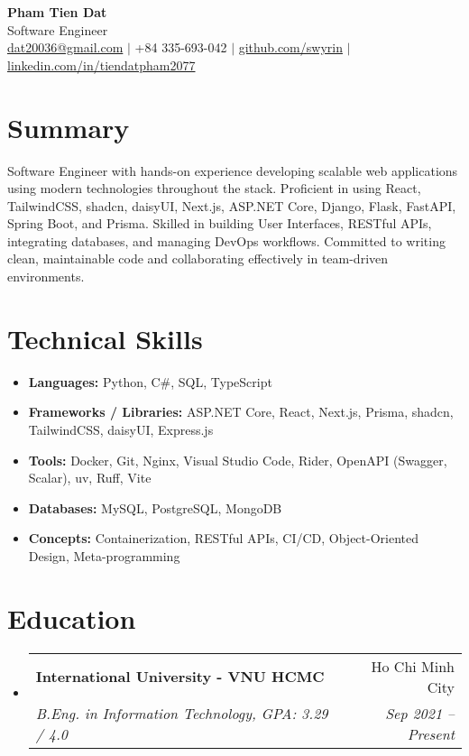 \documentclass[letterpaper,11pt]{article}
\makeatletter
\newcommand{\resumeSubheading}[4]{
  \item
    \begin{tabular*}{\textwidth}{l@{\extracolsep{\fill}}r}
      \textbf{#1} & #2 \\
      \textit{#3} & \textit{#4} \\
    \end{tabular*}
}
\newcommand{\resumeSectionStart}{\begin{itemize}[leftmargin=0.15in, label={}]}
\newcommand{\resumeSectionEnd}{\end{itemize}}
\makeatother
\begin{document}
\begin{center}
  \textbf{\Huge Pham Tien Dat} \\ \vspace{1pt}
   \vspace{1pt} Software Engineer \\
   \vspace{1pt}
  \href{mailto:dat20036@gmail.com}{dat20036@gmail.com} $|$
  +84 335-693-042 $|$
  \href{https://github.com/swyrin}{github.com/swyrin} $|$
  \href{https://linkedin.com/in/tiendatpham2077}{linkedin.com/in/tiendatpham2077}
\end{center}

\section*{Summary}
Software Engineer with hands-on experience developing scalable web applications using modern technologies throughout the stack. Proficient in using React, TailwindCSS, shadcn, daisyUI, Next.js, ASP.NET Core, Django, Flask, FastAPI, Spring Boot, and Prisma. Skilled in building User Interfaces, RESTful APIs, integrating databases, and managing DevOps workflows. Committed to writing clean, maintainable code and collaborating effectively in team-driven environments.

\section*{Technical Skills}
\resumeSectionStart
  \item \textbf{Languages:} Python, C\#, SQL, TypeScript
  \item \textbf{Frameworks / Libraries:} ASP.NET Core, React, Next.js, Prisma, shadcn, TailwindCSS, daisyUI, Express.js
  \item \textbf{Tools:} Docker, Git, Nginx, Visual Studio Code, Rider, OpenAPI (Swagger, Scalar), uv, Ruff, Vite
  \item \textbf{Databases:} MySQL, PostgreSQL, MongoDB
  \item \textbf{Concepts:} Containerization, RESTful APIs, CI/CD, Object-Oriented Design, Meta-programming
\resumeSectionEnd

\section*{Education}
\resumeSectionStart
  \resumeSubheading
    {International University - VNU HCMC}{Ho Chi Minh City}
    {B.Eng. in Information Technology, GPA: 3.29 / 4.0}{Sep 2021 -- Present}
\resumeSectionEnd
\end{document}
